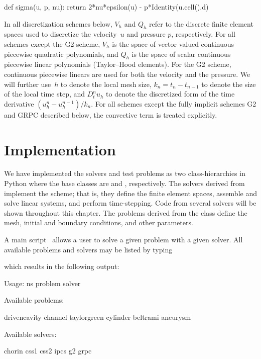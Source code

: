 \vspace*{3pt}

\begin{python}
def sigma(u, p, nu):
    return 2*nu*epsilon(u) - p*Identity(u.cell().d)
\end{python}

\vspace*{5pt}

In all discretization schemes below, $V_h$ and $Q_h$ refer to the
discrete finite element spaces used to discretize the velocity~$u$ and
pressure $p$, respectively. For all schemes except the G2 scheme,
$V_h$ is the space of vector-valued continuous piecewise quadratic
polynomials, and $Q_h$ is the space of scalar continuous piecewise
linear polynomials (Taylor--Hood elements). For the G2 scheme,
continuous piecewise linears are used for both the velocity and the
pressure. We will further use~$h$ to denote the local mesh size, $k_n
= t_n - t_{n-1}$ to denote the size of the local time step, and $D^n_t
u_h$ to denote the discretized form of the time derivative $(u_h^n -
u_h^{n-1})/k_n$. For all schemes except the fully implicit schemes G2
and GRPC described below, the convective term is treated explicitly.

\vspace*{3pt}
\section{Implementation}

We have implemented the solvers and test problems as two
class-hierarchies in Python where the base classes are
 and , respectively. The solvers
derived from  implement the scheme; that is, they
define the finite element spaces, assemble and solve linear systems,
and perform time-stepping. Code from several solvers will be shown
throughout this chapter. The problems derived from the
 class define the mesh, initial and boundary
conditions, and other parameters.

A main script~ allows a user to solve a given problem with a
given solver. All available problems and solvers may be listed by typing\vspace*{3pt}

\pagebreak

\noindent which results in the following output:
\begin{bash}
Usage: ns problem solver

Available problems:

  drivencavity
  channel
  taylorgreen
  cylinder
  beltrami
  aneurysm

Available solvers:

  chorin
  css1
  css2
  ipcs
  g2
  grpc
\end{bash}

